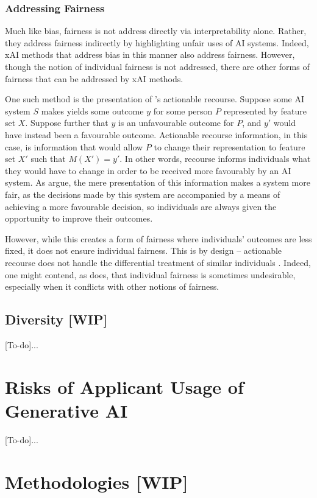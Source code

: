 \subsubsection{Addressing Fairness}
Much like bias, fairness is not address directly via interpretability alone. Rather, they address fairness indirectly by highlighting unfair uses of AI systems. Indeed, xAI methods that address bias in this manner also address fairness. However, though the notion of individual fairness is not addressed, there are other forms of fairness that can be addressed by xAI methods.

One such method is the presentation of \textcite{ustun_actionable_2019}'s actionable recourse. Suppose some AI system $S$ makes yields some outcome $y$ for some person $P$ represented by feature set $X$. Suppose further that $y$ is an unfavourable outcome for $P$, and $y'$ would have instead been a favourable outcome. Actionable recourse information, in this case, is information that would allow $P$ to change their representation to feature set $X'$ such that $M(X')= y'$. In other words, recourse informs individuals what they would have to change in order to be received more favourably by an AI system. As \textcite{ustun_actionable_2019} argue, the mere presentation of this information makes a system more fair, as the decisions made by this system are accompanied by a means of achieving a more favourable decision, so individuals are always given the opportunity to improve their outcomes.

However, while this creates a form of fairness where individuals' outcomes are less fixed, it does not ensure individual fairness. This is by design – actionable recourse does not handle the differential treatment of similar individuals \cite{ustun_actionable_2019}. Indeed, one might contend, as \textcite{Fleisher_2021} does, that individual fairness is sometimes undesirable, especially when it conflicts with other notions of fairness.

\subsection{Diversity [WIP]}
[To-do]...

\section{Risks of Applicant Usage of Generative AI}
[To-do]...

\section{Methodologies [WIP]}
